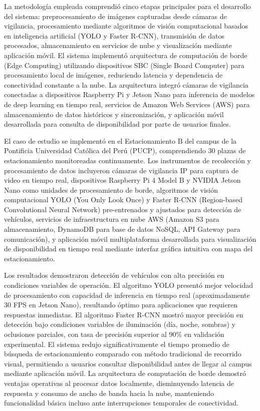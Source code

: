 \documentclass[12pt,a4paper]{article}
\begin{document}
La metodología empleada comprendió cinco etapas principales para el desarrollo del sistema: preprocesamiento de imágenes capturadas desde cámaras de vigilancia, procesamiento mediante algoritmos de visión computacional basados en inteligencia artificial (YOLO y Faster R-CNN), transmisión de datos procesados, almacenamiento en servicios de nube y visualización mediante aplicación móvil. El sistema implementó arquitectura de computación de borde (Edge Computing) utilizando dispositivos SBC (Single Board Computer) para procesamiento local de imágenes, reduciendo latencia y dependencia de conectividad constante a la nube. La arquitectura integró cámaras de vigilancia conectadas a dispositivos Raspberry Pi y Jetson Nano para inferencia de modelos de deep learning en tiempo real, servicios de Amazon Web Services (AWS) para almacenamiento de datos históricos y sincronización, y aplicación móvil desarrollada para consulta de disponibilidad por parte de usuarios finales.

El caso de estudio se implementó en el Estacionamiento B del campus de la Pontificia Universidad Católica del Perú (PUCP), comprendiendo 30 plazas de estacionamiento monitoreadas continuamente. Los instrumentos de recolección y procesamiento de datos incluyeron cámaras de vigilancia IP para captura de video en tiempo real, dispositivos Raspberry Pi 4 Model B y NVIDIA Jetson Nano como unidades de procesamiento de borde, algoritmos de visión computacional YOLO (You Only Look Once) y Faster R-CNN (Region-based Convolutional Neural Network) pre-entrenados y ajustados para detección de vehículos, servicios de infraestructura en nube AWS (Amazon S3 para almacenamiento, DynamoDB para base de datos NoSQL, API Gateway para comunicación), y aplicación móvil multiplataforma desarrollada para visualización de disponibilidad en tiempo real mediante interfaz gráfica intuitiva con mapa del estacionamiento.

Los resultados demostraron detección de vehículos con alta precisión en condiciones variables de operación. El algoritmo YOLO presentó mejor velocidad de procesamiento con capacidad de inferencia en tiempo real (aproximadamente 30 FPS en Jetson Nano), resultando óptimo para aplicaciones que requieren respuestas inmediatas. El algoritmo Faster R-CNN mostró mayor precisión en detección bajo condiciones variables de iluminación (día, noche, sombras) y oclusiones parciales, con tasa de precisión superior al 90\% en validación experimental. El sistema redujo significativamente el tiempo promedio de búsqueda de estacionamiento comparado con método tradicional de recorrido visual, permitiendo a usuarios consultar disponibilidad antes de llegar al campus mediante aplicación móvil. La arquitectura de computación de borde demostró ventajas operativas al procesar datos localmente, disminuyendo latencia de respuesta y consumo de ancho de banda hacia la nube, manteniendo funcionalidad básica incluso ante interrupciones temporales de conectividad.
\end{document}
